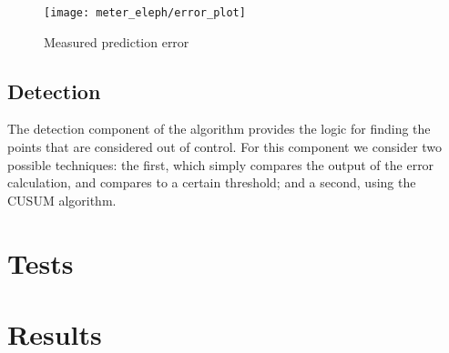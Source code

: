 \begin{figure} [H]
    \centering
    \texttt{[image: meter\_eleph/error\_plot]}
    \caption {Measured prediction error}
    \label{fig:error_plot}
\end{figure}

\subsection{Detection}

The detection component of the algorithm provides the logic for finding the points that are considered out of control. For this component we consider two possible techniques: the first, which simply compares the output of the error calculation, and compares 
to a certain threshold; and a second, using the CUSUM algorithm. 

% 

\section {Tests}
\section {Results}

